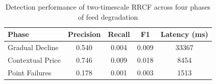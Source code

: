 \begin{table}[htbp]
\centering
\caption{Detection performance of two-timescale RRCF across four phases of feed degradation}
\label{tab:rq1-phase-detection}
\begin{tabular}{lcccc}
\toprule
Phase & Precision & Recall & F1 & Latency (ms) \\
\midrule
Gradual Decline & 0.540 & 0.004 & 0.009 & 33367 \\
Contextual Price & 0.746 & 0.009 & 0.018 & 8454 \\
Point Failures & 0.178 & 0.001 & 0.003 & 1513 \\
\bottomrule
\end{tabular}
\end{table}